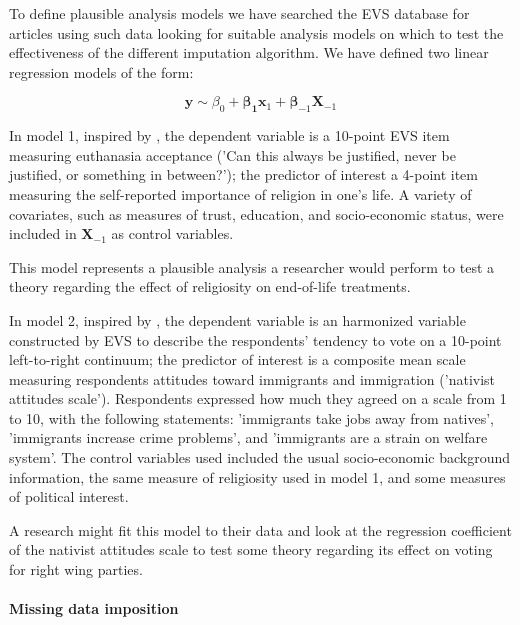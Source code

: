 	To define plausible analysis models we have searched the EVS database for articles using
	such data looking for suitable analysis models on which to test the effectiveness of 
	the different imputation algorithm.
	We have defined two linear regression models of the form:
	\begin{center}
		\begin{equation} \label{eqn:lm}
			\bm{y} \sim \beta_0 + \bm{\beta_1} \bm{x}_1 + \bm{\beta}_{-1} \bm{X}_{-1}
		\end{equation}
	\end{center}

	In model 1, inspired by \cite{koneke:2014}, the dependent variable is a 10-point EVS item measuring euthanasia 
	acceptance ('Can this always be justified, never be justified, or something in between?'); the predictor 
	of interest a 4-point item measuring the self-reported importance of religion in one's life.
	A variety of covariates, such as measures of trust, education, and socio-economic status, were included in 
	$\bm{X}_{-1}$ as control variables.

	This model represents a plausible analysis a researcher would perform to test a theory regarding the 
	effect of religiosity on end-of-life treatments.

	In model 2, inspired by \cite{immerzeel:2015}, the dependent variable is an harmonized variable
	constructed by EVS to describe the respondents' tendency to vote on a 10-point left-to-right continuum; 
	the predictor of interest is a composite mean scale measuring respondents attitudes toward immigrants 
	and immigration ('nativist attitudes scale').
	Respondents expressed how much they agreed on a scale from 1 to 10, with the following statements: 
	'immigrants take jobs away from natives', 'immigrants increase crime problems', and 
	'immigrants are a strain on welfare system'.
	The control variables used included the usual socio-economic background information, the same measure of
	religiosity used in model 1, and some measures of political interest.

	A research might fit this model to their data and look at the regression coefficient of the nativist attitudes
	scale to test some theory regarding its effect on voting for right wing parties.

\paragraph{Missing data imposition}

